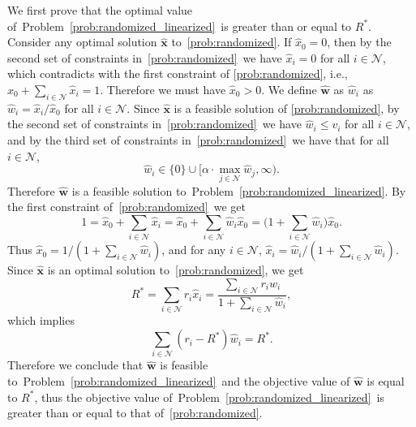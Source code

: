 \documentclass[mnsc,non-blindrev]{informs3}
\theoremstyle{definition}
\begin{document}
\begin{appendices}{\Large{}}
We first prove that the optimal value of~Problem~\eqref{prob:randomized_linearized}~is greater than or equal to $R^*$. Consider any optimal solution $\hat{\bm{x}}$ to~\ref{prob:randomized}. If $\hat{x}_0=0$, then by the second set of constraints in~\ref{prob:randomized}~we have $\hat{x}_i=0$ for all $i\in\mathcal{N}$, which contradicts with the first constraint of \ref{prob:randomized}, i.e., \mbox{$\hat{x}_0+\sum_{i\in\mathcal{N}}\hat{x}_i=1$.} Therefore we must have $\hat{x}_0>0$. We define $\hat{\bm{w}}$ as $\hat{w}_i$ as $\hat{w}_i=\hat{x}_i/\hat{x}_0$ for all $i\in\mathcal{N}$. Since $\hat{\bm{x}}$ is a feasible solution of \ref{prob:randomized}, by the second set of constraints in~\ref{prob:randomized}~we have $\hat{w}_i\leq v_i$ for all $i\in\mathcal{N}$, and by the third set of constraints in~\ref{prob:randomized}~we have that for all $i\in\mathcal{N}$,
\begin{equation*}
\hat{w}_i\in\{0\}\cup\Big[\alpha\cdot\max_{j\in\mathcal{N}}\hat{w}_j,\infty\Big).
\end{equation*}
Therefore $\hat{\bm{w}}$ is a feasible solution to~Problem~\eqref{prob:randomized_linearized}. By the first constraint of~\ref{prob:randomized}~we get
\begin{equation*}
1=\hat{x}_0+\sum_{i\in\mathcal{N}}\hat{x}_i=\hat{x}_0+\sum_{i\in\mathcal{N}}\hat{w}_i\hat{x}_0=\Big(1+\sum_{i\in\mathcal{N}}\hat{w}_i\Big)\hat{x}_0.
\end{equation*}
Thus $\hat{x}_0=1/(1+\sum_{i\in\mathcal{N}}\hat{w}_i)$, and for any $i\in\mathcal{N}$, $\hat{x}_i=\hat{w}_i/(1+\sum_{i\in\mathcal{N}}\hat{w}_i)$. Since $\hat{\bm{x}}$ is an optimal solution to~\ref{prob:randomized}, we get
\begin{equation*}
R^*=\sum_{i\in\mathcal{N}}r_i\hat{x}_i=\dfrac{\sum_{i\in\mathcal{N}}r_i\hat{w}_i}{1+\sum_{i\in\mathcal{N}}\hat{w}_i},
\end{equation*}
which implies
\begin{equation*}
\sum_{i\in\mathcal{N}}(r_i-R^*)\hat{w}_i=R^*.
\end{equation*}
Therefore we conclude that $\hat{\bm{w}}$ is feasible to~Problem~\eqref{prob:randomized_linearized}~and the objective value of $\hat{\bm{w}}$ is equal to $R^*$, thus the objective value of~Problem~\eqref{prob:randomized_linearized}~is greater than or equal to that of~\ref{prob:randomized}.


\end{appendices}
\end{document}
